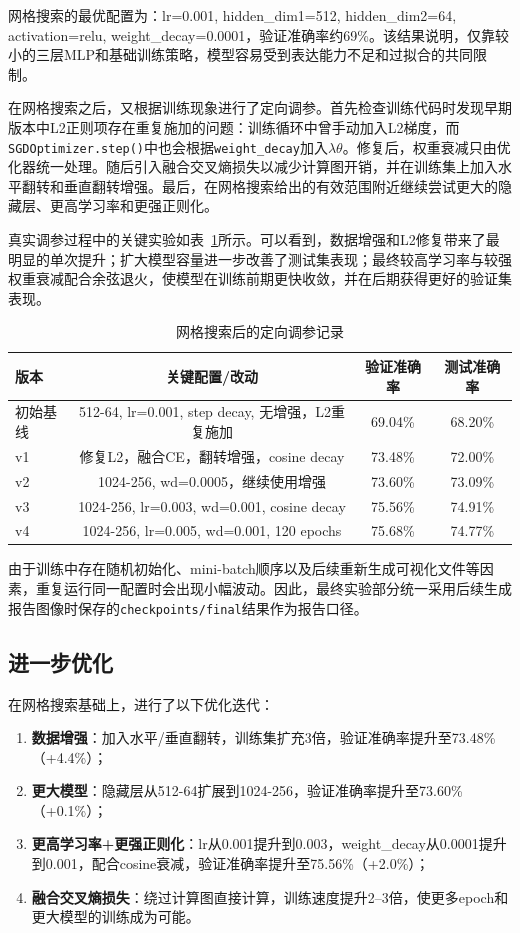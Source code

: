 \documentclass[12pt,a4paper]{article}
\begin{document}
网格搜索的最优配置为：lr=0.001, hidden\_dim1=512, hidden\_dim2=64, activation=relu, weight\_decay=0.0001，验证准确率约69\%。该结果说明，仅靠较小的三层MLP和基础训练策略，模型容易受到表达能力不足和过拟合的共同限制。

在网格搜索之后，又根据训练现象进行了定向调参。首先检查训练代码时发现早期版本中L2正则项存在重复施加的问题：训练循环中曾手动加入L2梯度，而\texttt{SGDOptimizer.step()}中也会根据\texttt{weight\_decay}加入$\lambda\theta$。修复后，权重衰减只由优化器统一处理。随后引入融合交叉熵损失以减少计算图开销，并在训练集上加入水平翻转和垂直翻转增强。最后，在网格搜索给出的有效范围附近继续尝试更大的隐藏层、更高学习率和更强正则化。

真实调参过程中的关键实验如表~\ref{tab:tuning_log}所示。可以看到，数据增强和L2修复带来了最明显的单次提升；扩大模型容量进一步改善了测试集表现；最终较高学习率与较强权重衰减配合余弦退火，使模型在训练前期更快收敛，并在后期获得更好的验证集表现。

\begin{table}[H]
\centering
\caption{网格搜索后的定向调参记录}
\label{tab:tuning_log}
\begin{tabular}{lccc}
\toprule
\textbf{版本} & \textbf{关键配置/改动} & \textbf{验证准确率} & \textbf{测试准确率} \\
\midrule
初始基线 & 512-64, lr=0.001, step decay, 无增强，L2重复施加 & 69.04\% & 68.20\% \\
v1 & 修复L2，融合CE，翻转增强，cosine decay & 73.48\% & 72.00\% \\
v2 & 1024-256, wd=0.0005，继续使用增强 & 73.60\% & 73.09\% \\
v3 & 1024-256, lr=0.003, wd=0.001, cosine decay & 75.56\% & 74.91\% \\
v4 & 1024-256, lr=0.005, wd=0.001, 120 epochs & 75.68\% & 74.77\% \\
\bottomrule
\end{tabular}
\end{table}

由于训练中存在随机初始化、mini-batch顺序以及后续重新生成可视化文件等因素，重复运行同一配置时会出现小幅波动。因此，最终实验部分统一采用后续生成报告图像时保存的\texttt{checkpoints/final}结果作为报告口径。

\subsection{进一步优化}

在网格搜索基础上，进行了以下优化迭代：

\begin{enumerate}[leftmargin=2em]
    \item \textbf{数据增强}：加入水平/垂直翻转，训练集扩充3倍，验证准确率提升至73.48\%（+4.4\%）；
    \item \textbf{更大模型}：隐藏层从512-64扩展到1024-256，验证准确率提升至73.60\%（+0.1\%）；
    \item \textbf{更高学习率+更强正则化}：lr从0.001提升到0.003，weight\_decay从0.0001提升到0.001，配合cosine衰减，验证准确率提升至75.56\%（+2.0\%）；
    \item \textbf{融合交叉熵损失}：绕过计算图直接计算，训练速度提升2--3倍，使更多epoch和更大模型的训练成为可能。
\end{enumerate}
\end{document}
